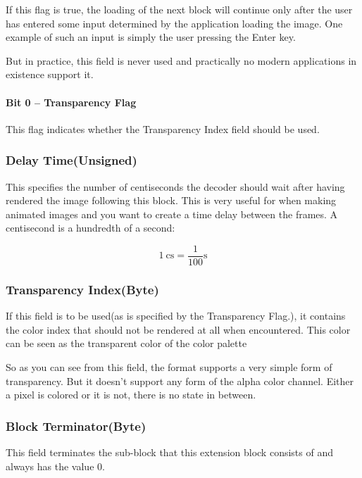 If this flag is true, the loading of the next block will continue only
after the user has entered some input determined by the application
loading the image. One example of such an input is simply the user
pressing the Enter key.

But in practice, this field is never used and practically no modern
applications in existence support it.

\paragraph{Bit 0 -- Transparency Flag }

This flag indicates whether the Transparency Index field should be
used.

\subsubsection{Delay Time(Unsigned)}

This specifies the number of centiseconds the decoder should wait
after having rendered the image following this block. This is very
useful for when making animated \gif images and you want to create a time
delay between the frames. A centisecond is a hundredth of a second:

\begin{equation*}
  \SI{1}{\centi\second} = \frac{1}{100}\si{\second}
\end{equation*}

\subsubsection{Transparency Index(Byte)}

If this field is to be used(as is specified by the Transparency
Flag.), it contains the color index that should not be rendered at all
when encountered. This color can be seen as the transparent color of
the color palette

So as you can see from this field, the \gif format supports a very
simple form of transparency. But it doesn't support any form of the
alpha color channel. Either a pixel is colored or it is not, there is
no state in between.

\subsubsection{Block Terminator(Byte)}

This field terminates the sub-block that this extension block
consists of and always has the value $0$.

